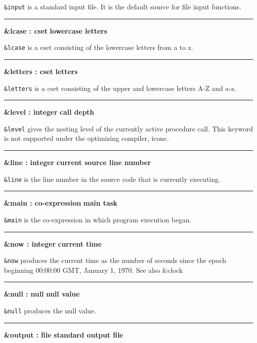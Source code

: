 \noindent
{}\texttt{\&input} is a standard input
file. It is the default source for file input functions.

\bigskip\hrule\vspace{0.1cm}
\noindent
{\bf \&lcase : cset } \hfill {\bf lowercase letters}

\noindent
{}\texttt{\&lcase} is a cset consisting of
the lowercase letters from a to z.

\bigskip\hrule\vspace{0.1cm}
\noindent
{\bf \&letters : cset } \hfill {\bf letters}

\noindent
{}\texttt{\&letters} is a cset consisting
of the upper and lowercase letters A-Z and a-z.

\bigskip\hrule\vspace{0.1cm}
\noindent
{\bf \&level : integer } \hfill {\bf call depth}

\noindent
{}\texttt{\&level} gives the nesting level of the
currently active procedure call. This keyword is not supported under
the optimizing compiler, iconc.

\bigskip\hrule\vspace{0.1cm}
\noindent
{\bf \&line : integer } \hfill {\bf current source line number}

\noindent
{}\texttt{\&line} is the line number in the
source code that is currently executing.

\bigskip\hrule\vspace{0.1cm}
\noindent
{\bf \&main : co{}-expression } \hfill {\bf main task}

\noindent
{}\texttt{\&main} is the co-expression in which program
execution began.

\bigskip\hrule\vspace{0.1cm}
\noindent
{\bf \&now : integer } \hfill {\bf current time}

\noindent
{}\texttt{\&now} produces the current time as the
number of seconds since the epoch beginning 00:00:00 GMT, January 1,
1970. See also \&clock

\bigskip\hrule\vspace{0.1cm}
\noindent
{\bf \&null : null } \hfill {\bf null value}

\noindent
{}\texttt{\&null} produces the null value.

\bigskip\hrule\vspace{0.1cm}
\noindent
{\bf \&output : file } \hfill {\bf standard output file}

